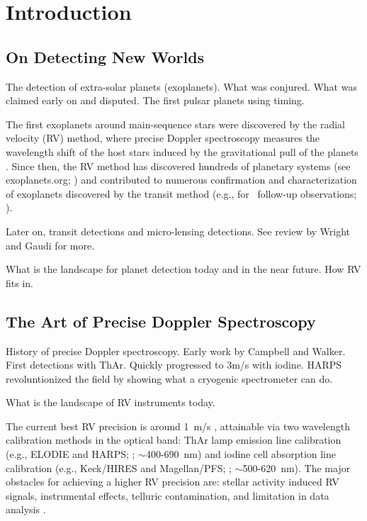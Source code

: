 \chapter{Introduction}

\section{On Detecting New Worlds}
The detection of extra-solar planets (exoplanets). What was conjured.
What was claimed early on and disputed. The first pulsar planets using timing.

The first exoplanets around main-sequence stars were discovered by the
radial velocity (RV) method, where precise Doppler spectroscopy
measures the wavelength shift of the host stars induced by the
gravitational pull of the planets \citep{1988ApJ...331..902C,
  1989Natur.339...38L, 1993ApJ...413..339H, 1995Natur.378..355M,
  1996ApJ...464L.153B}. Since then, the RV method has discovered
hundreds of planetary systems (see exoplanets.org; \citealt{eod2014})
and contributed to numerous confirmation and characterization of
exoplanets discovered by the transit method (e.g., for
\kepler\ follow-up observations; \citealt{Marcy2014}).

Later on, transit detections and micro-lensing detections. See review
by Wright and Gaudi for more.

What is the landscape for planet detection today and in the near
future. How RV fits in. 

\section{The Art of Precise Doppler Spectroscopy}

History of precise Doppler spectroscopy. Early work by Campbell and
Walker. First detections with ThAr. Quickly progressed to 3m/s with
iodine. HARPS revoluntionized the field by showing what a cryogenic 
spectrometer can do.

What is the landscape of RV instruments today.

The current best RV precision is around 1~m/s \citep{eprv2015},
attainable via two wavelength calibration methods in the optical band:
ThAr lamp emission line calibration (e.g., ELODIE and HARPS;
\citealt{elodie, harps-s}; $\sim$400-690~nm) and iodine cell
absorption line calibration (e.g., Keck/HIRES and Magellan/PFS;
\citealt{butler1996, 2010SPIE.7735E..53C}; $\sim$500-620~nm). The
major obstacles for achieving a higher RV precision are: stellar
activity induced RV signals, instrumental effects, telluric
contamination, and limitation in data analysis \citep{eprv2015}.

